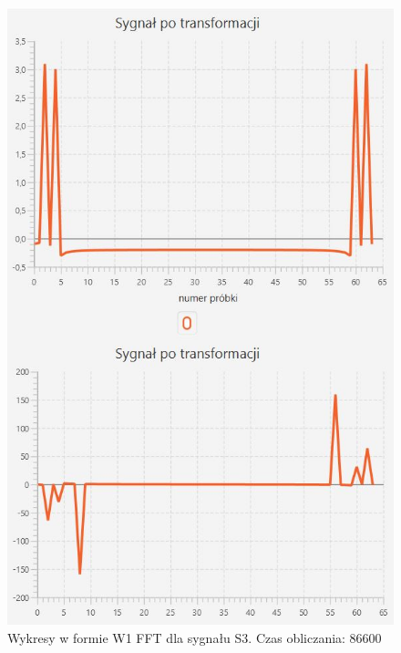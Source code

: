 \documentclass[12pt]{article}
\begin{document}
\begin{figure}[H]
	\centering
	\includegraphics[width=.8\linewidth]{FFT-S3-W1}
	\caption{Wykresy w formie W1 FFT dla sygnału S3. Czas obliczania: 86600}
	\label{S3_sygnal}
\end{figure}
\end{document}
